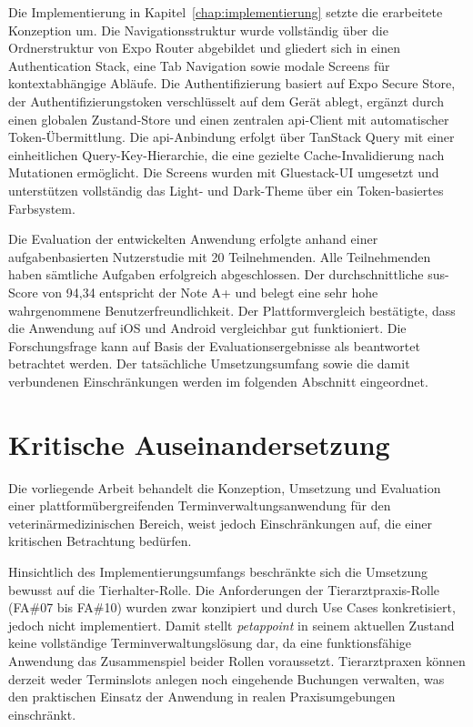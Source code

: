 Die Implementierung in Kapitel~\ref{chap:implementierung} setzte die erarbeitete Konzeption um. Die Navigationsstruktur wurde vollständig über die Ordnerstruktur von Expo Router abgebildet und gliedert sich in einen Authentication Stack, eine Tab Navigation sowie modale Screens für kontextabhängige Abläufe. Die Authentifizierung basiert auf Expo Secure Store, der Authentifizierungstoken verschlüsselt auf
dem Gerät ablegt, ergänzt durch einen globalen Zustand-Store und
einen zentralen \gls{api}-Client mit automatischer
Token-Übermittlung. Die \gls{api}-Anbindung erfolgt über TanStack
Query mit einer einheitlichen Query-Key-Hierarchie, die eine gezielte Cache-Invalidierung nach Mutationen ermöglicht. Die Screens wurden mit Gluestack-UI umgesetzt und unterstützen vollständig das Light- und Dark-Theme über ein Token-basiertes Farbsystem.

Die Evaluation der entwickelten Anwendung erfolgte anhand einer
aufgabenbasierten Nutzerstudie mit 20 Teilnehmenden. Alle
Teilnehmenden haben sämtliche Aufgaben erfolgreich abgeschlossen. Der durchschnittliche \gls{sus}-Score von 94,34 entspricht der Note A+ und belegt eine sehr hohe wahrgenommene Benutzerfreundlichkeit. Der Plattformvergleich bestätigte, dass die Anwendung auf iOS und Android vergleichbar gut funktioniert. Die Forschungsfrage kann auf Basis der Evaluationsergebnisse als beantwortet betrachtet werden. Der tatsächliche Umsetzungsumfang sowie die damit verbundenen Einschränkungen werden im folgenden Abschnitt eingeordnet.


\section{Kritische Auseinandersetzung}

Die vorliegende Arbeit behandelt die Konzeption, Umsetzung und Evaluation einer plattformübergreifenden Terminverwaltungsanwendung für den veterinärmedizinischen Bereich, weist jedoch Einschränkungen auf, die einer kritischen Betrachtung bedürfen.

Hinsichtlich des Implementierungsumfangs beschränkte sich die Umsetzung bewusst auf die Tierhalter-Rolle. Die Anforderungen der Tierarztpraxis-Rolle (FA\#07 bis FA\#10) wurden zwar konzipiert und durch Use Cases konkretisiert, jedoch nicht implementiert. Damit stellt \textit{petappoint} in seinem aktuellen Zustand keine vollständige Terminverwaltungslösung dar, da eine funktionsfähige Anwendung das Zusammenspiel beider Rollen voraussetzt. Tierarztpraxen können derzeit weder Terminslots anlegen noch eingehende Buchungen verwalten, was den praktischen Einsatz der Anwendung in realen Praxisumgebungen einschränkt.


